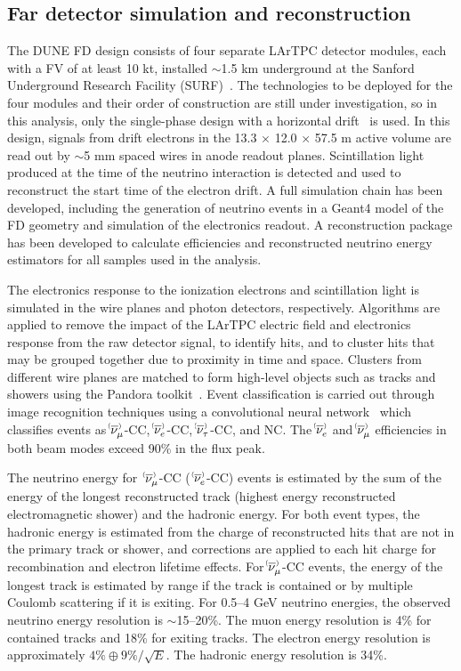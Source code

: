 \subsection{Far detector simulation and reconstruction}
\label{sec:fd}
The DUNE FD design consists of four separate LArTPC detector modules, each with a FV of at least 10 kt, installed $\sim$1.5 km underground at the Sanford Underground Research Facility (SURF)~\cite{Abi:2018dnh}. The technologies to be deployed for the four modules and their order of construction are still under investigation, so in this analysis, only the single-phase design with a horizontal drift~\cite{Abi:2020loh} is used. In this design, signals from drift electrons in the 13.3 $\times$ 12.0 $\times$ 57.5 m active volume are read out by $\sim$5 mm spaced wires in anode readout planes. Scintillation light produced at the time of the neutrino interaction is detected and used to reconstruct the start time of the electron drift. A full simulation chain has been developed, including the generation of neutrino events in a Geant4 model of the FD geometry and simulation of the electronics readout. A reconstruction package has been developed to calculate efficiencies and reconstructed neutrino energy estimators for all samples used in the analysis.

The electronics response to the ionization electrons and scintillation light is simulated in the wire planes and photon detectors, respectively. Algorithms are applied to remove the impact of the LArTPC electric field and electronics response from the raw detector signal, to identify hits, and to cluster hits that may be grouped together due to proximity in time and space. Clusters from different wire planes are matched to form high-level objects such as tracks and showers using the Pandora toolkit~\cite{Marshall:2015rfa,Acciarri:2017hat}. Event classification is carried out through image recognition techniques using a convolutional neural network~\cite{cvn_paper} which classifies events as $\nu^{\bracketbar}_{\mu}$-CC, $\nu^{\bracketbar}_{e}$-CC, $\nu^{\bracketbar}_{\tau}$-CC, and NC. The $\nue^{\bracketbar}$ and $\numu^{\bracketbar}$ efficiencies in both beam modes exceed 90\% in the flux peak.

The neutrino energy for $\;\nu^{\bracketbar}_{\mu}$-CC ($\;\nu^{\bracketbar}_{e}$-CC) events is estimated by the sum of the energy of the longest reconstructed track (highest energy reconstructed electromagnetic shower) and the hadronic energy. For both event types, the hadronic energy is estimated from the charge of reconstructed hits that are not in the primary track or shower, and corrections are applied to each hit charge for recombination and electron lifetime effects. For $\nu^{\bracketbar}_{\mu}$-CC events, the energy of the longest track is estimated by range if the track is contained or by multiple Coulomb scattering if it is exiting. For 0.5--4 GeV neutrino energies, the observed neutrino energy resolution is $\sim$15--20\%. The muon energy resolution is 4\% for contained tracks and 18\% for exiting tracks. The electron energy resolution is approximately $4\% \oplus 9\%/\sqrt{E}$. The hadronic energy resolution is 34\%.

